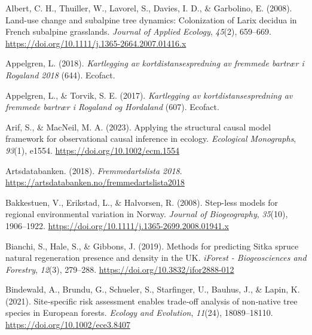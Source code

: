 \documentclass[
]{article}
\newlength{\cslhangindent}
\newenvironment{CSLReferences}[2] %
 {\begin{list}{}{%
  \setlength{\itemindent}{0pt}
  \setlength{\leftmargin}{0pt}
  \setlength{\parsep}{0pt}
  \ifodd #1
   \setlength{\leftmargin}{\cslhangindent}
   \setlength{\itemindent}{-1\cslhangindent}
  \fi
  \setlength{\itemsep}{#2\baselineskip}}}
 {\end{list}}
\begin{document}
\label{refs}
\begin{CSLReferences}{1}{0}
Albert, C. H., Thuiller, W., Lavorel, S., Davies, I. D., \& Garbolino, E. (2008). Land-use change and subalpine tree dynamics: Colonization of {Larix} decidua in {French} subalpine grasslands. \emph{Journal of Applied Ecology}, \emph{45}(2), 659--669. \url{https://doi.org/10.1111/j.1365-2664.2007.01416.x}

Appelgren, L. (2018). \emph{Kartlegging av kortdistansespredning av fremmede bartrær i {Rogaland} 2018} (644). {Ecofact}.

Appelgren, L., \& Torvik, S. E. (2017). \emph{Kartlegging av kortdistansespredning av fremmede bartrær i {Rogaland} og {Hordaland}} (607). {Ecofact}.

Arif, S., \& MacNeil, M. A. (2023). Applying the structural causal model framework for observational causal inference in ecology. \emph{Ecological Monographs}, \emph{93}(1), e1554. \url{https://doi.org/10.1002/ecm.1554}

Artsdatabanken. (2018). \emph{Fremmedartslista 2018}. \url{https://artsdatabanken.no/fremmedartslista2018}

Bakkestuen, V., Erikstad, L., \& Halvorsen, R. (2008). Step-less models for regional environmental variation in {Norway}. \emph{Journal of Biogeography}, \emph{35}(10), 1906--1922. \url{https://doi.org/10.1111/j.1365-2699.2008.01941.x}

Bianchi, S., Hale, S., \& Gibbons, J. (2019). Methods for predicting {Sitka} spruce natural regeneration presence and density in the {UK}. \emph{iForest - Biogeosciences and Forestry}, \emph{12}(3), 279--288. \url{https://doi.org/10.3832/ifor2888-012}

Bindewald, A., Brundu, G., Schueler, S., Starfinger, U., Bauhus, J., \& Lapin, K. (2021). Site‐specific risk assessment enables trade‐off analysis of non‐native tree species in {European} forests. \emph{Ecology and Evolution}, \emph{11}(24), 18089--18110. \url{https://doi.org/10.1002/ece3.8407}


\end{CSLReferences}
\end{document}
